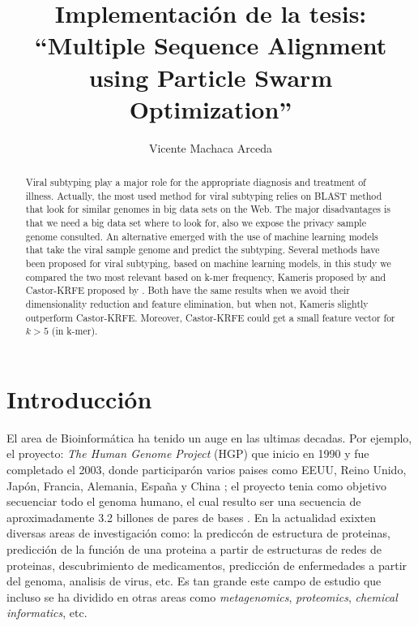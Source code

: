 \documentclass{cup-pan}
\title{Implementación de la tesis: \\``Multiple Sequence Alignment using Particle Swarm Optimization''}
\author[1]{Vicente Machaca Arceda}
\affil[1]{Universidad Nacional de San Agustín de Arequipa. Email: \url{vicente.machaca.a@gmail.com}}
\begin{document}
	
	\maketitle
	
	\begin{abstract}
		Viral subtyping play a major role for the appropriate diagnosis and treatment of illness. Actually, the most used method for viral subtyping relies on BLAST method that look for similar genomes in big data sets on the Web. The major disadvantages is that we need a big data set where to look for, also we expose the privacy sample genome consulted. An alternative emerged with the use of machine learning models that take the viral sample genome and predict the subtyping. Several methods have been proposed for viral subtyping, based on machine learning models, in this study we compared the two most relevant based on k-mer frequency, Kameris proposed by \citet{solis2018open} and Castor-KRFE proposed by \citet{lebatteux2019toward}. Both have the same results when we avoid their dimensionality reduction and feature elimination, but when not, Kameris slightly outperform Castor-KRFE. Moreover, Castor-KRFE could get a small feature vector for $k>5$ (in k-mer).
		
	\end{abstract}
	
	
	\section{Introducción}
	El area de Bioinformática ha tenido un auge en las ultimas decadas. Por ejemplo, el proyecto: \textit{The Human Genome Project} (HGP) que inicio en 1990 y fue completado el 2003, donde participarón varios paises como EEUU, Reino Unido, Japón, Francia, Alemania, España y China  \citep{hgp2021}; el proyecto tenia como objetivo secuenciar todo el genoma humano, el cual resulto ser una secuencia de aproximadamente 3.2 billones de pares de bases \citep{archibald2018genomics}. En la actualidad exixten diversas areas de investigación como: la prediccón de estructura de proteinas, predicción de la función de una proteina a partir de estructuras de redes de proteinas, descubrimiento de medicamentos, predicción de enfermedades a partir del genoma, analisis de virus, etc. Es tan grande este campo de estudio que incluso se ha dividido en otras areas como \textit{metagenomics}, \textit{proteomics}, \textit{chemical informatics}, etc. 
	
\end{document}
